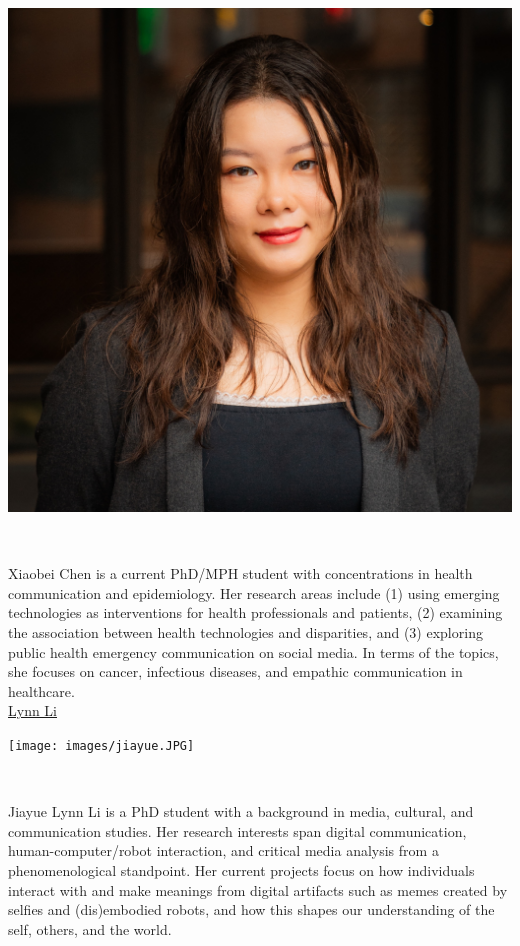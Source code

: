 \documentclass[]{article}
\begin{document}
\includegraphics{images/xiaobei.JPG}

~

Xiaobei Chen is a current PhD/MPH student with concentrations in health
communication and epidemiology. Her research areas include (1) using
emerging technologies as interventions for health professionals and
patients, (2) examining the association between health technologies and
disparities, and (3) exploring public health emergency communication on
social media. In terms of the topics, she focuses on cancer, infectious
diseases, and empathic communication in healthcare.\\

\href{https://www.jou.ufl.edu/staff/jiayue-lynn-li/}{Lynn Li}

\texttt{[image: images/jiayue.JPG]}

~

Jiayue Lynn Li is a PhD student with a background in media, cultural,
and communication studies. Her research interests span digital
communication, human-computer/robot interaction, and critical media
analysis from a phenomenological standpoint. Her current projects focus
on how individuals interact with and make meanings from digital
artifacts such as memes created by selfies and (dis)embodied robots, and
how this shapes our understanding of the self, others, and the world.\\
\end{document}
